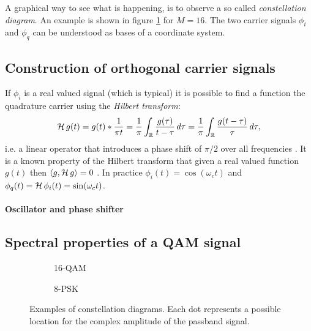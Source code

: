 A graphical way to see what is happening, is to observe a so called \emph{constellation diagram}. An example is shown in figure \ref{fig:qam-constellation} for \(M = 16\). The two carrier signals \(\phi_i\) and \(\phi_q\) can be understood as bases of a coordinate system.

\subsection{Construction of orthogonal carrier signals}


If \(\phi_i\) is a real valued signal (which is typical) it is possible to find a function the quadrature carrier using the \emph{Hilbert transform}:
\begin{equation}
	\operatorname{\mathcal{H}} g(t) = g(t) * \frac{1}{\pi t}
		= \frac{1}{\pi} \int_\mathbb{R} \frac{g(\tau)}{t - \tau} \,d\tau
		= \frac{1}{\pi} \int_\mathbb{R} \frac{g(t - \tau)}{\tau} \,d\tau,
\end{equation}
i.e. a linear operator that introduces a phase shift of \(\pi / 2\) over all frequencies \cite{Hsu,Gallager}. It is a known property of the Hilbert transform that given a real valued function \(g(t)\) then \(\langle g, \operatorname{\mathcal{H}} g \rangle = 0\) \cite{Kschischang,Kneubuehler}.
In practice \(\phi_i(t) = \cos(\omega_c t)\) and \(\phi_q(t) = \operatorname{\mathcal{H}} \phi_i(t) = \sin(\omega_c t)\).  

\paragraph{Oscillator and phase shifter}

\subsection{Spectral properties of a QAM signal}

\begin{figure}
	\hfill
	\begin{subfigure}{.4\linewidth}
		
		\caption{16-QAM\label{fig:qam-constellation}}
	\end{subfigure}
	\hfill
	\begin{subfigure}{.4\linewidth}
		
		\caption{8-PSK\label{fig:psk-constellation}}
	\end{subfigure}
	\hfill
	\caption{
		Examples of constellation diagrams. Each dot represents a possible location for the complex amplitude of the passband signal.
	}
\end{figure}


